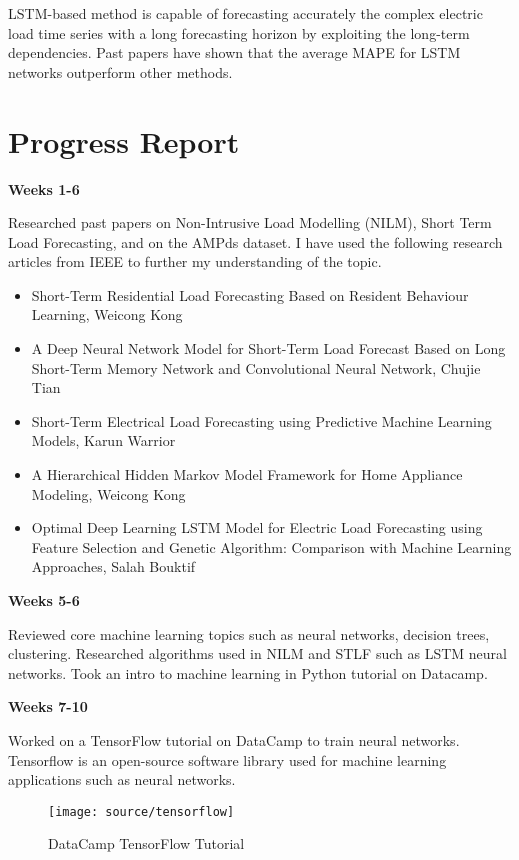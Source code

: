 \documentclass[12pt,twocolumn]{article}
\begin{document}
				LSTM-based method is capable of forecasting accurately the complex electric load time series with a long forecasting horizon by exploiting the long-term dependencies. Past papers have shown that the average MAPE for LSTM networks outperform other methods. 

	\section{Progress Report}
		\textbf{Weeks 1-6}

			Researched past papers on Non-Intrusive Load Modelling (NILM), Short Term Load Forecasting, and on the AMPds dataset. I have used the following research articles from IEEE to further my understanding of the topic.

			\begin{itemize}
				\item Short-Term Residential Load Forecasting Based on Resident Behaviour Learning, Weicong Kong
				\item A Deep Neural Network Model for Short-Term Load Forecast Based on Long Short-Term Memory Network and Convolutional Neural Network, Chujie Tian
				\item Short-Term Electrical Load Forecasting using Predictive Machine Learning Models, Karun Warrior
				\item A Hierarchical Hidden Markov Model Framework for Home Appliance Modeling, Weicong Kong
				\item Optimal Deep Learning LSTM Model for Electric Load Forecasting using Feature Selection and Genetic Algorithm: Comparison with Machine Learning Approaches, Salah Bouktif
			\end{itemize}

		\textbf{Weeks 5-6}
			
			Reviewed core machine learning topics such as neural networks, decision trees, clustering. Researched algorithms used in NILM and STLF such as LSTM neural networks. Took an intro to machine learning in Python tutorial on Datacamp. 
			\newline

		\textbf{Weeks 7-10}

			Worked on a TensorFlow tutorial on DataCamp to train neural networks. Tensorflow is an open-source software library used for machine learning applications such as neural networks. 
			\newline

			\begin{figure}[!h]
					\centering
					\texttt{[image: source/tensorflow]}
					\caption{DataCamp TensorFlow Tutorial}
			\end{figure}
\end{document}
